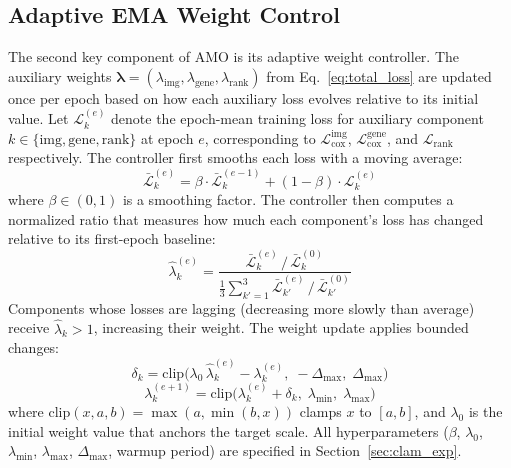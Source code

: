 \documentclass[10pt,twocolumn,letterpaper]{article}
\begin{document}
\subsection{Adaptive EMA Weight Control}
\label{sec:adaptive}

The second key component of AMO is its adaptive weight controller.
The auxiliary weights $\boldsymbol{\lambda} = (\lambda_{\text{img}},
\lambda_{\text{gene}}, \lambda_{\text{rank}})$ from
Eq.~\ref{eq:total_loss} are updated once per epoch based on how
each auxiliary loss evolves relative to its initial value. Let
$\mathcal{L}_k^{(e)}$ denote the epoch-mean training loss for
auxiliary component $k \in \{\text{img}, \text{gene}, \text{rank}\}$
at epoch $e$, corresponding to $\mathcal{L}_{\text{cox}}^{\text{img}}$,
$\mathcal{L}_{\text{cox}}^{\text{gene}}$, and
$\mathcal{L}_{\text{rank}}$ respectively. The controller first
smooths each loss with a moving average:
\begin{equation}
\bar{\mathcal{L}}_k^{(e)} = \beta \cdot \bar{\mathcal{L}}_k^{(e-1)} +
(1 - \beta) \cdot \mathcal{L}_k^{(e)}
\end{equation}
where $\beta \in (0, 1)$ is a smoothing factor. The controller
then computes a normalized ratio that measures how much each
component's loss has changed relative to its first-epoch baseline:
\begin{equation}
\hat{\lambda}_k^{(e)} = \frac{\bar{\mathcal{L}}_k^{(e)} \,/\,
\bar{\mathcal{L}}_k^{(0)}}
{\frac{1}{3}\sum_{k'=1}^{3} \bar{\mathcal{L}}_{k'}^{(e)} \,/\,
\bar{\mathcal{L}}_{k'}^{(0)}}
\label{eq:weight_ratio}
\end{equation}
Components whose losses are lagging (decreasing more slowly than
average) receive $\hat{\lambda}_k > 1$, increasing their weight.
The weight update applies bounded changes:
\begin{equation}
\delta_k = \mathrm{clip}\!\big(\lambda_0\,\hat{\lambda}_k^{(e)} -
\lambda_k^{(e)},\; -\Delta_{\max},\; \Delta_{\max}\big)
\label{eq:weight_delta}
\end{equation}
\begin{equation}
\lambda_k^{(e+1)} = \mathrm{clip}\!\big(\lambda_k^{(e)} + \delta_k,\;
\lambda_{\min},\; \lambda_{\max}\big)
\label{eq:weight_update}
\end{equation}
where $\mathrm{clip}(x, a, b) = \max(a, \min(b, x))$ clamps $x$ to
$[a, b]$, and $\lambda_0$ is the initial weight value that anchors
the target scale. All hyperparameters ($\beta$, $\lambda_0$,
$\lambda_{\min}$, $\lambda_{\max}$, $\Delta_{\max}$, warmup period)
are specified in Section~\ref{sec:clam_exp}.
\end{document}
